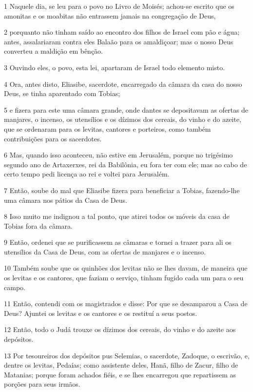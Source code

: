 \par 1 Naquele dia, se leu para o povo no Livro de Moisés; achou-se escrito que os amonitas e os moabitas não entrassem jamais na congregação de Deus,
\par 2 porquanto não tinham saído ao encontro dos filhos de Israel com pão e água; antes, assalariaram contra eles Balaão para os amaldiçoar; mas o nosso Deus converteu a maldição em bênção.
\par 3 Ouvindo eles, o povo, esta lei, apartaram de Israel todo elemento misto.
\par 4 Ora, antes disto, Eliasibe, sacerdote, encarregado da câmara da casa do nosso Deus, se tinha aparentado com Tobias;
\par 5 e fizera para este uma câmara grande, onde dantes se depositavam as ofertas de manjares, o incenso, os utensílios e os dízimos dos cereais, do vinho e do azeite, que se ordenaram para os levitas, cantores e porteiros, como também contribuições para os sacerdotes.
\par 6 Mas, quando isso aconteceu, não estive em Jerusalém, porque no trigésimo segundo ano de Artaxerxes, rei da Babilônia, eu fora ter com ele; mas ao cabo de certo tempo pedi licença ao rei e voltei para Jerusalém.
\par 7 Então, soube do mal que Eliasibe fizera para beneficiar a Tobias, fazendo-lhe uma câmara nos pátios da Casa de Deus.
\par 8 Isso muito me indignou a tal ponto, que atirei todos os móveis da casa de Tobias fora da câmara.
\par 9 Então, ordenei que se purificassem as câmaras e tornei a trazer para ali os utensílios da Casa de Deus, com as ofertas de manjares e o incenso.
\par 10 Também soube que os quinhões dos levitas não se lhes davam, de maneira que os levitas e os cantores, que faziam o serviço, tinham fugido cada um para o seu campo.
\par 11 Então, contendi com os magistrados e disse: Por que se desamparou a Casa de Deus? Ajuntei os levitas e os cantores e os restituí a seus postos.
\par 12 Então, todo o Judá trouxe os dízimos dos cereais, do vinho e do azeite aos depósitos.
\par 13 Por tesoureiros dos depósitos pus Selemias, o sacerdote, Zadoque, o escrivão, e, dentre os levitas, Pedaías; como assistente deles, Hanã, filho de Zacur, filho de Matanias; porque foram achados fiéis, e se lhes encarregou que repartissem as porções para seus irmãos.
